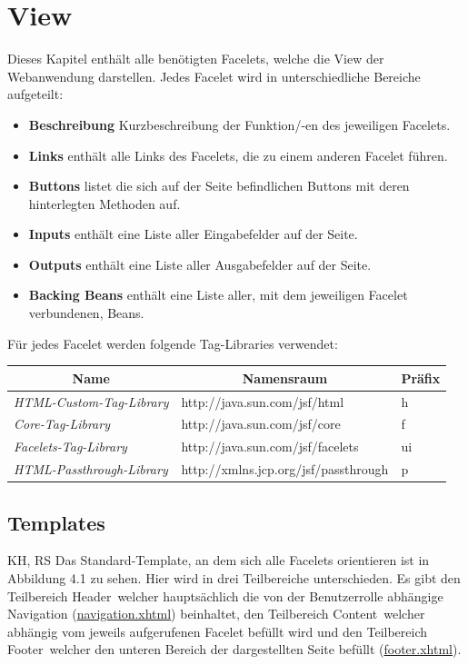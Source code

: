 \chapter{View}
	
		Dieses Kapitel enthält alle benötigten Facelets, welche die View der Webanwendung darstellen. Jedes Facelet wird in unterschiedliche  Bereiche aufgeteilt:
		\begin{itemize}
			\item \textbf{Beschreibung} Kurzbeschreibung der Funktion/-en des jeweiligen Facelets.
			\item \textbf{Links} enthält alle Links des Facelets, die zu einem anderen Facelet führen.
			\item \textbf{Buttons} listet die sich auf der Seite befindlichen Buttons mit deren hinterlegten Methoden auf.
			\item \textbf{Inputs} enthält eine Liste aller Eingabefelder auf der Seite.
			\item \textbf{Outputs} enthält eine Liste aller Ausgabefelder auf der Seite.
			\item \textbf{Backing Beans} enthält eine Liste aller, mit dem jeweiligen Facelet verbundenen, Beans.
		\end{itemize}
		Für jedes Facelet werden folgende Tag-Libraries verwendet:
			\begin{center}
				\begin{longtable}{|p{6cm} | p{8cm}| p{2cm}|}
					
					\hline \multicolumn{1}{|c|}{\textbf{Name}} & \multicolumn{1}{c|}{\textbf{Namensraum}} & \multicolumn{1}{c|}{\textbf{Präfix}} \\ \hline
					\endfirsthead
					\hline
					\endlastfoot
					\textit{HTML-Custom-Tag-Library} & http://java.sun.com/jsf/html & h\\ \hline
					\textit{Core-Tag-Library} & http://java.sun.com/jsf/core & f\\ \hline
					\textit{Facelets-Tag-Library} & http://java.sun.com/jsf/facelets & ui\\ \hline
					\textit{HTML-Passthrough-Library} & http://xmlns.jcp.org/jsf/passthrough & p\\ \hline
				\end{longtable}
			\end{center}
		
		\section{Templates}
		KH, RS
		Das Standard-Template, an dem sich alle Facelets orientieren ist in Abbildung 4.1 zu sehen. Hier wird in drei Teilbereiche unterschieden. Es gibt den Teilbereich \glqq Header\grqq\, welcher hauptsächlich die von der Benutzerrolle abhängige Navigation (\hyperlink{navigation}{navigation.xhtml}) beinhaltet, den Teilbereich \glqq Content\grqq\, welcher abhängig vom jeweils aufgerufenen Facelet befüllt wird und den Teilbereich \glqq Footer\grqq\, welcher den unteren Bereich der dargestellten Seite befüllt (\hyperlink{footer}{footer.xhtml}).
		
